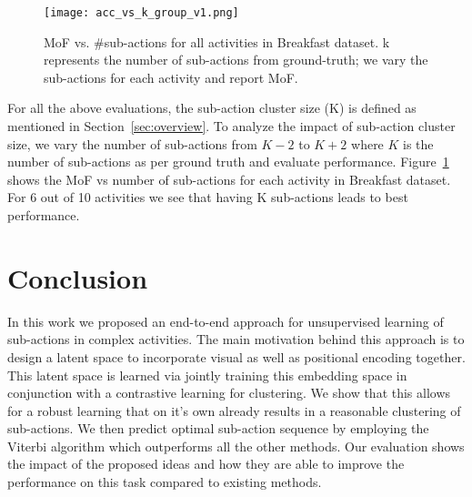 \documentclass[final]{cvpr}
\begin{document}
\begin{figure}
  \texttt{[image: acc\_vs\_k\_group\_v1.png]}
  \caption{{\small MoF vs. \#sub-actions for all activities in Breakfast dataset. k represents the number of sub-actions from ground-truth; we vary the sub-actions for each activity and report MoF.
  }}%
 \vspace{-0.2cm}
 \label{fig:ablation_acc_vs_act}
\end{figure}

 For all the above evaluations, the sub-action cluster size (K) is defined as mentioned in Section~\ref{sec:overview}. To analyze the impact of sub-action cluster size, we vary the number of sub-actions from $K-2$ to $K+2$ where $K$ is the number of sub-actions as per ground truth and evaluate performance. Figure~\ref{fig:ablation_acc_vs_act} shows the MoF vs number of sub-actions for each activity in Breakfast dataset. For 6 out of 10 activities we see that having K sub-actions leads to best performance.


\section{Conclusion}
In this work we proposed an end-to-end approach for unsupervised learning of sub-actions in complex activities. The main motivation behind this approach is to design a latent space to incorporate visual as well as positional encoding together. This latent space is learned via jointly training this embedding space in conjunction with a contrastive learning for clustering. We show that this allows for a robust learning that on it's own already results in a reasonable clustering of sub-actions. We then predict optimal sub-action sequence by employing the Viterbi algorithm which outperforms all the other methods. Our evaluation shows the impact of the proposed ideas and how they are able to improve the performance on this task compared to existing methods.

{\small
% 


}
\end{document}
